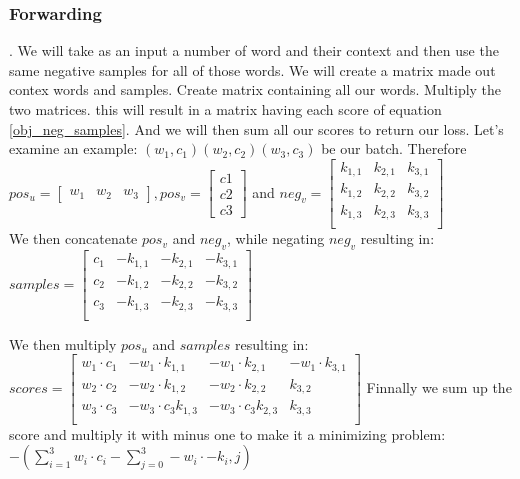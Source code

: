 \subsubsection{Forwarding}
. We will take as an input a number of word and their context and then use the same negative samples for all of those words. We will create a matrix made out contex words and samples. Create matrix containing all our words. Multiply the two matrices. this will result in a matrix having each score of equation \ref{obj_neg_samples}. And we will then sum all our scores to return our loss. 
Let's examine an example: $(w_1,c_1)(w_2,c_2)(w_3,c_3)$ be our batch. 
Therefore $pos_u = \begin{bmatrix}
w_1 & w_2 & w_3
\end{bmatrix}, pos_v = \begin{bmatrix}
c1\\
c2\\
c3\end{bmatrix}$ and $neg_v = 
\begin{bmatrix}
k_{1,1} & k_{2,1} & k_{3,1}\\
k_{1,2} & k_{2,2} & k_{3,2}\\
k_{1,3} & k_{2,3} & k_{3,3}\\
\end{bmatrix}$\\
 We then concatenate $pos_v$ and $neg_v$, while negating $neg_v$
resulting in: \\
$samples = \begin{bmatrix}
c_1 & -k_{1,1} & -k_{2,1} & - k_{3,1}\\
c_2 &- k_{1,2} & -k_{2,2} & -k_{3,2}\\
c_3 & -k_{1,3} & -k_{2,3}& - k_{3,3}\\
\end{bmatrix}$

We then multiply $pos_u$ and $samples$ resulting in: \\
$scores = \begin{bmatrix}
w_1 \cdot c_1 & -w_1 \cdot k_{1,1} & -w_1 \cdot  k_{2,1} & -w_1 \cdot  k_{3,1}\\
w_2 \cdot c_2 & -w_2 \cdot k_{1,2} & -w_2 \cdot k_{2,2} & k_{3,2}\\
w_3 \cdot c_3 &-w_3 \cdot c_3  k_{1,3} & -w_3 \cdot c_3 k_{2,3}& k_{3,3}\\
\end{bmatrix}$
Finnally we sum up the score and multiply it with minus one to make it a minimizing problem: \\
 $-(\sum_{i=1}^3 w_i \cdot c_i - \sum_{j=0}^3 -w_i \cdot -k_i,j)$
 
